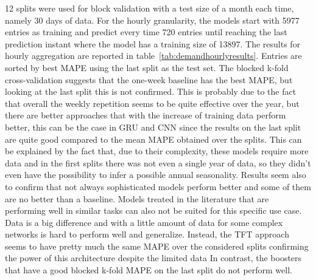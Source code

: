 12 splits were used for block validation with a test size of a month each time, namely 30 days of data.
For the hourly granularity, the models start with 5977 entries as training and predict every time 720 entries until reaching the last prediction instant where the model has a training size of 13897.
The results for hourly aggregation are reported in table~\ref{tab:demandhourlyresults}.
Entries are sorted by best MAPE using the last split as the test set.
The blocked k-fold cross-validation suggests that the one-week baseline has the best MAPE, but looking at the last split this is not confirmed.
This is probably due to the fact that overall the weekly repetition seems to be quite effective over the year, but there are better approaches that with the increase of training data perform better, this can be the case in GRU and CNN since the results on the last split are quite good compared to the mean MAPE obtained over the splits.
This can be explained by the fact that, due to their complexity, these models require more data and in the first splits there was not even a single year of data, so they didn't even have the possibility to infer a possible annual seasonality.
Results seem also to confirm that not always sophisticated models perform better and some of them are no better than a baseline.
Models treated in the literature that are performing well in similar tasks can also not be suited for this specific use case.
Data is a big difference and with a little amount of data for some complex networks is hard to perform well and generalize.
Instead, the TFT approach seems to have pretty much the same MAPE over the considered splits confirming the power of this architecture despite the limited data
In contrast, the boosters that have a good blocked k-fold MAPE on the last split do not perform well.

